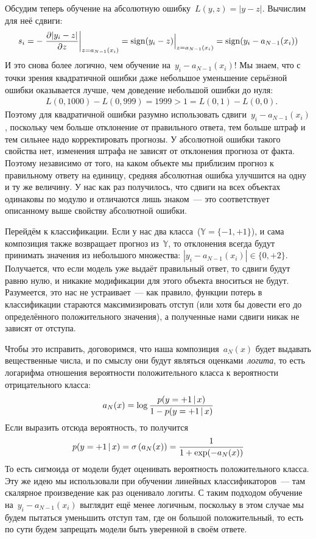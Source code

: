 \documentclass[12pt,fleqn]{article}
\begin{document}
Обсудим теперь обучение на абсолютную ошибку~$L(y, z) = |y - z|$.
Вычислим для неё сдвиги:
\[
    s_i = - \left. \frac{\partial |y_i - z|}{\partial 
        z} \right|_{z=a_{N-1}(x_i)} = 
    \Bigl. \mathop{\rm sign}\limits(y_i - z) \Bigr|_{z=a_{N-1}(x_i)} =
    \mathop{\rm sign}\limits(y_i - a_{N-1}(x_i))
\]
И это снова более логично, чем обучение на~$y_i - a_{N - 1}(x_i)$!
Мы знаем, что с точки зрения квадратичной ошибки даже небольшое уменьшение серьёзной ошибки
оказывается лучше, чем доведение небольшой ошибки до нуля:
\begin{align*}
    &L(0, 1000) - L(0, 999) = 1999 > 1 = L(0, 1) - L(0, 0).
\end{align*}
Поэтому для квадратичной ошибки разумно использовать сдвиги~$y_i - a_{N - 1}(x_i)$,
поскольку чем больше отклонение от правильного ответа, тем больше штраф и тем сильнее надо корректировать прогнозы.
У абсолютной ошибки такого свойства нет, изменения штрафа не зависят от отклонения прогноза от факта.
Поэтому независимо от того, на каком объекте мы приблизим прогноз к правильному ответу на единицу,
средняя абсолютная ошибка улучшится на одну и ту же величину.
У нас как раз получилось, что сдвиги на всех объектах одинаковы по модулю и отличаются лишь знаком~---
это соответствует описанному выше свойству абсолютной ошибки.

Перейдём к классификации.
Если у нас два класса~($\mathbb{Y} = \{-1, +1\}$),
и сама композиция также возвращает прогноз из~$\mathbb{Y}$,
то отклонения всегда будут принимать значения из небольшого множества:
$|y_i - a_{N - 1}(x_i)| \in \{0, +2\}$.
Получается, что если модель уже выдаёт правильный ответ, то сдвиги будут равню нулю,
и никакие модификации для этого объекта вноситься не будут.
Разумеется, это нас не устраивает~--- как правило, функции потерь в классификации
стараются максимизировать отступ (или хотя бы довести его до определённого положительного значения),
а полученные нами сдвиги никак не зависят от отступа.

Чтобы это исправить, договоримся, что наша композиция~$a_N(x)$ будет выдавать вещественные числа,
и по смыслу они будут являться оценками~\emph{логита},
то есть логарифма отношения вероятности положительного класса к вероятности отрицательного класса:
\[
    a_N(x)
    =
    \log
    \frac{
        p(y = +1 \mspace{3mu}{|}\mspace{3mu} x)
    }{
        1 - p(y = +1 \mspace{3mu}{|}\mspace{3mu} x)
    }
\]
Если выразить отсюда вероятность, то получится
\[
    p(y = +1 \mspace{3mu}{|}\mspace{3mu} x)
    =
    \sigma\left(
        a_N(x)
    \right)
    =
    \frac{
        1
    }{
        1 + \exp(-a_{N}(x))
    }
\]
То есть сигмоида от модели будет оценивать вероятность положительного класса.
Эту же идею мы использовали при обучении линейных классификаторов~--- там скалярное произведение как раз
оценивало логиты.
С таким подходом обучение на~$y_i - a_{N - 1}(x_i)$ выглядит ещё менее логичным, поскольку в этом случае
мы будем пытаться уменьшить отступ там, где он большой положительный,
то есть по сути будем запрещать модели быть уверенной в своём ответе.
\end{document}
